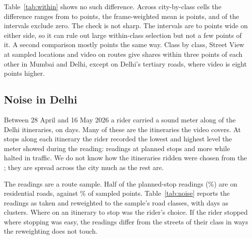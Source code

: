 \documentclass[11pt]{article}
\begin{document}
\begin{table}[H]
\centering
\caption{Women's share of pedestrians in video frames within 100 meters of a sampled point (near) and farther away (far), by road class. The difference is near minus far, with a 95\% interval from resampling fieldwork days. Navi Mumbai is omitted: its \pointsNaviMumbai{} sampled points leave almost no frame far from one.}
\label{tab:within}
\end{table}

Table~\ref{tab:within} shows no such difference. Across \withincells{} city-by-class cells the difference ranges from \withindifferencemin{} to \withindifferencemax{} points, the frame-weighted mean is \withindifferencemean{} points, and \withincellsexcludingzero{} of the intervals exclude zero. The check is not sharp. The intervals are \withinhalfwidthmin{} to \withinhalfwidthmax{} points wide on either side, so it can rule out large within-class selection but not a few points of it. A second comparison mostly points the same way. Class by class, Street View at sampled locations and video on routes give shares within three points of each other in Mumbai and Delhi, except on Delhi's tertiary roads, where video is eight points higher.

\subsection{Noise in Delhi}

Between 28 April and 16 May 2026 a rider carried a sound meter along \noiseitineraries{} of the \delhiitineraries{} Delhi itineraries, on \noisedays{} days. Many of these are the itineraries the video covers. At stops along each itinerary the rider recorded the lowest and highest level the meter showed during the reading: \noiseplanned{} readings at planned stops and \noisetraffic{} more while halted in traffic. We do not know how the \noiseitineraries{} itineraries ridden were chosen from the \delhiitineraries; they are spread across the city much as the rest are.

The readings are a route sample. Half of the planned-stop readings (\noiseresidential\%) are on residential roads, against \delhisampleresidential\% of sampled points. Table~\ref{tab:noise} reports the readings as taken and reweighted to the sample's road classes, with days as clusters. Where on an itinerary to stop was the rider's choice. If the rider stopped where stopping was easy, the readings differ from the streets of their class in ways the reweighting does not touch.
\end{document}
